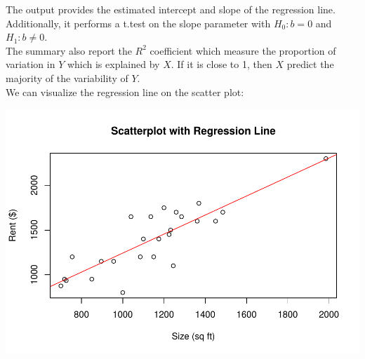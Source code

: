 \documentclass[
]{article}
\newenvironment{Shaded}{\begin{snugshade}}{\end{snugshade}}
\newcommand{\AttributeTok}[1]{\textcolor[rgb]{0.13,0.29,0.53}{#1}}
\newcommand{\DecValTok}[1]{\textcolor[rgb]{0.00,0.00,0.81}{#1}}
\newcommand{\FunctionTok}[1]{\textcolor[rgb]{0.13,0.29,0.53}{\textbf{#1}}}
\newcommand{\NormalTok}[1]{#1}
\newcommand{\SpecialCharTok}[1]{\textcolor[rgb]{0.81,0.36,0.00}{\textbf{#1}}}
\newcommand{\StringTok}[1]{\textcolor[rgb]{0.31,0.60,0.02}{#1}}
\begin{document}
The output provides the estimated intercept and slope of the regression
line. Additionally, it performs a t.test on the slope parameter with
\(H_0: b=0\) and \(H_1:b \not= 0\).\\
The summary also report the \(R^2\) coefficient which measure the
proportion of variation in \(Y\) which is explained by \(X\). If it is
close to 1, then \(X\) predict the majority of the variability of
\(Y\).\\
We can visualize the regression line on the scatter plot:

\begin{Shaded}
\end{Shaded}

\includegraphics{Tests_and_Applications_files/figure-latex/unnamed-chunk-39-1.pdf}

\begin{Shaded}
\end{Shaded}
\end{document}
